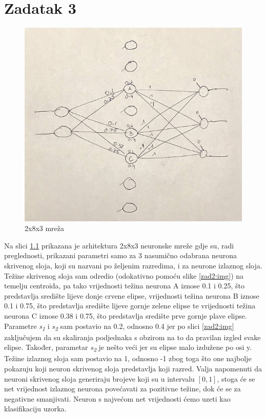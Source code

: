 \documentclass[times, utf8, seminar]{fer}
\begin{document}
\chapter{Zadatak 3}
\begin{figure}[H]
    \centering
    \includegraphics[scale=0.65]{img/zad_3.jpg}
    \caption{2x8x3 mreža}
    \label{zad3:img}
\end{figure}
Na slici \ref{zad3:img} prikazana je arhitektura 2x8x3 neuronske mreže gdje su, radi preglednosti, prikazani parametri samo za 3 nasumično odabrana neurona skrivenog sloja, koji su nazvani po željenim razredima, i za neurone izlaznog sloja. Težine skrivenog sloja sam odredio (odokativno pomoću slike \ref{zad2:img}) na temelju centroida, pa tako vrijednosti težina neurona A iznose 0.1 i 0.25, što predstavlja središte lijeve donje crvene elipse, vrijednosti težina neurona B iznose 0.1 i 0.75, što predstavlja središte lijeve gornje zelene elipse te vrijednosti težina neurona C iznose 0.38 i 0.75, što predstavlja središte prve gornje plave elipse. Parametre \textit{s\textsubscript{1}} i \textit{s\textsubscript{2}} sam postavio na 0.2, odnosno 0.4 jer po slici \ref{zad2:img} zaključujem da su skaliranja podjednaka s obzirom na to da pravilan izgled svake elipse. Također, parametar \textit{s\textsubscript{2}} je nešto veći jer su elipse malo izdužene po osi y. Težine izlaznog sloja sam postavio na 1, odnosno -1 zbog toga što one najbolje pokazuju koji neuron skrivenog sloja predstavlja koji razred. Valja napomenuti da neuroni skrivenog sloja generiraju brojeve koji su u intervalu $[0,1]$, stoga će se net vrijednost izlaznog neurona povećavati za pozitivne težine, dok će se za negativne smanjivati. Neuron s najvećom net vrijednosti ćemo uzeti kao klasifikaciju uzorka.
\end{document}
